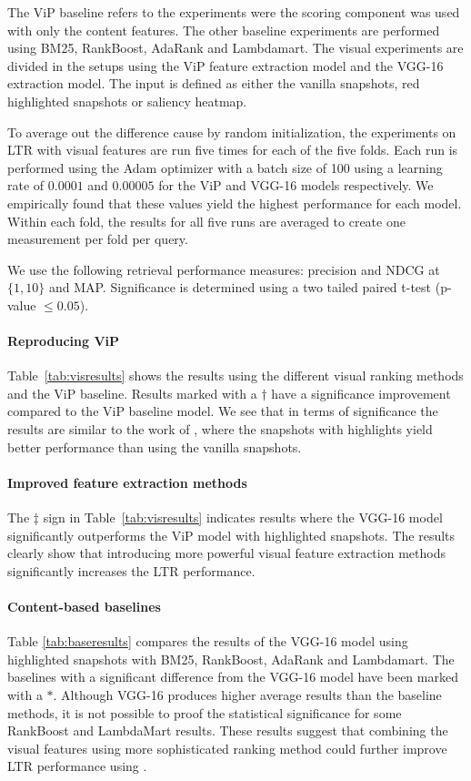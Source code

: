 The ViP baseline refers to the experiments were the scoring component was used with only the content features. The other baseline experiments are performed using BM25, RankBoost, AdaRank and Lambdamart. 
The visual experiments are divided in the setups using the ViP feature extraction model and the VGG-16 extraction model. The input is defined as either the vanilla snapshots, red highlighted snapshots or saliency heatmap. 

To average out the difference cause by random initialization, the experiments on \ac{LTR} with visual features are run five times for each of the five folds. 
Each run is performed using the Adam optimizer with a batch size of 100 using a learning rate of $0.0001$ and $0.00005$ for the ViP and VGG-16 models respectively. We empirically found that these values yield the highest performance for each model.
Within each fold, the results for all five runs are averaged to create one measurement per fold per query.

We use the following retrieval performance measures: precision and NDCG at $\{1,10\}$ and MAP.
Significance is determined using a two tailed paired t-test (p-value $\leq 0.05$). 

\paragraph{Reproducing ViP}
Table~\ref{tab:visresults} shows the results using the different visual ranking methods and the ViP baseline. 
Results marked with a $\dagger$ have a significance improvement compared to the ViP baseline model. 
We see that in terms of significance the results are similar to the work of \citet{fan2017learning}, where the snapshots with highlights yield better performance than using the vanilla snapshots.

\paragraph{Improved feature extraction methods}
The $\ddagger$ sign in Table~\ref{tab:visresults} indicates results where the VGG-16 model significantly outperforms the ViP model with highlighted snapshots. The results clearly show that introducing more powerful visual feature extraction methods significantly increases the \ac{LTR} performance.

\paragraph{Content-based baselines}
Table \ref{tab:baseresults} compares the results of the VGG-16 model using highlighted snapshots with BM25, RankBoost, AdaRank and Lambdamart. The baselines with a significant difference from the VGG-16 model have been marked with a $*$. Although VGG-16 produces higher average results than the baseline methods, it is not possible to proof the statistical significance for some RankBoost and LambdaMart results. These results suggest that combining the visual features using more sophisticated ranking method could further improve \ac{LTR} performance using \datasetname. 

